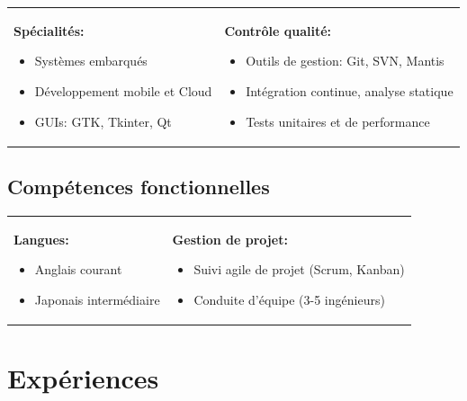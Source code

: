 \documentclass[letterpaper]{twentysecondcv} %
\begin{document}
\begin{tabular*}{\textwidth}{ll}
	\parbox[t]{0.45\textwidth}{
		\textbf{Sp\'ecialit\'es:}
		\begin{itemize}
			\item Syst\`emes embarqu\'es
			\item D\'eveloppement mobile et Cloud
			\item GUIs: GTK, Tkinter, Qt
		\end{itemize}
	} & \parbox[t]{0.55\textwidth}{
		\textbf{Contr\^ole qualit\'e:}
		\begin{itemize}
			\item Outils de gestion: Git, SVN, Mantis
			\item Int\'egration continue, analyse statique
			\item Tests unitaires et de performance
		\end{itemize}
	}
\end{tabular*}

\vspace{0.3cm}

\subsection{Comp\'etences fonctionnelles}

\begin{tabular*}{\textwidth}{ll}
	\parbox[t]{0.45\textwidth}{
		\textbf{Langues:}
		\begin{itemize}
			\item Anglais courant
			\item Japonais interm\'ediaire
		\end{itemize}
	} & \parbox[t]{0.55\textwidth}{
		\textbf{Gestion de projet:}
		\begin{itemize}
			\item Suivi agile de projet (Scrum, Kanban)
			\item Conduite d’\'equipe (3-5 ing\'enieurs)
		\end{itemize}
	}
\end{tabular*}


\vspace{0.5cm}

\section{Exp\'eriences}
\end{document}
